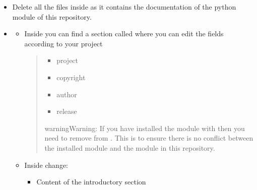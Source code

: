 \documentclass[letterpaper,10pt,english]{sphinxmanual}
\begin{document}
\begin{itemize}
\begin{description}
\end{description}

\item {} \begin{description}
\sphinxAtStartPar
Delete all the  files inside  as it contains the documentation of the python module of this repository.

\end{description}

\item {} \begin{description}
\begin{itemize}
\item {} 
\sphinxAtStartPar
Inside  you can find a section called  where you can edit the fields according to your project
\begin{quote}
\begin{itemize}
\item {} 
\sphinxAtStartPar
project

\item {} 
\sphinxAtStartPar
copyright

\item {} 
\sphinxAtStartPar
author

\item {} 
\sphinxAtStartPar
release

\end{itemize}

\begin{sphinxadmonition}{warning}{Warning:}
\sphinxAtStartPar
If you have installed the module with  then you need to remove  from . This is to ensure there is no conflict between the installed module and the module in this repository.
\end{sphinxadmonition}
\end{quote}

\item {} 
\sphinxAtStartPar
Inside  change:
\begin{itemize}
\item {} 
\sphinxAtStartPar
Content of the introductory section


\end{itemize}
\end{itemize}
\end{description}
\end{itemize}
\end{document}
